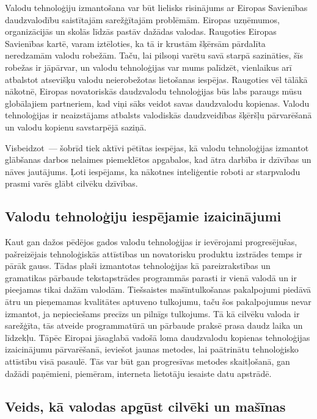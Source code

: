 \begin{multicols}{2}
Valodu tehnoloģiju izmantošana var būt lielisks risinājums ar Eiropas Savienības daudzvalodību saistītajām sarežģītajām problēmām.
Eiropas uzņēmumos, organizācijās un skolās līdzās pastāv dažādas valodas. 
Raugoties Eiropas Savienības kartē, varam iztēloties, ka tā ir krustām šķērsām pārdalīta neredzamām valodu robežām. 
Taču, lai pilsoņi varētu savā starpā sazināties, šīs robežas ir jāpārvar, un valodu tehnoloģijas var mums palīdzēt, vienlaikus arī atbalstot atsevišķu valodu neierobežotas lietošanas iespējas. 
Raugoties vēl tālākā nākotnē, Eiropas novatoriskās daudzvalodu tehnoloģijas būs labs paraugs mūsu globālajiem partneriem, kad viņi sāks veidot savas daudzvalodu kopienas. 
Valodu tehnoloģijas ir neaizstājams atbalsts valodiskās daudzveidības šķēršļu pārvarēšanā un valodu kopienu savstarpējā saziņā.

Visbeidzot~--- šobrīd tiek aktīvi pētītas iespējas, kā valodu tehnoloģijas izmantot glābšanas darbos nelaimes piemeklētos apgabalos, kad ātra darbība ir dzīvības un nāves jautājums. 
Ļoti iespējams, ka nākotnes inteliģentie roboti ar starpvalodu prasmi varēs glābt cilvēku dzīvības.

\subsection{Valodu tehnoloģiju iespējamie izaicinājumi}


Kaut gan dažos pēdējos gados valodu tehnoloģijas ir ievērojami progresējušas, pašreizējais tehnoloģiskās attīstības un novatorisku produktu izstrādes temps ir pārāk gauss. 
Tādas plaši izmantotas tehnoloģijas kā pareizrakstības un gramatikas pārbaude tekstapstrādes programmās parasti ir vienā valodā un ir pieejamas tikai dažām valodām.
Tiešsaistes mašīntulkošanas pakalpojumi piedāvā ātru un pieņemamas kvalitātes aptuveno tulkojumu, taču šos pakalpojumus nevar izmantot, ja nepieciešams precīzs un pilnīgs tulkojums. 
Tā kā cilvēku valoda ir sarežģīta, tās atveide programmatūrā un pārbaude praksē prasa daudz laika un līdzekļu. 
Tāpēc Eiropai jāsaglabā vadošā loma daudzvalodu kopienas tehnoloģijas izaicinājumu pārvarēšanā, ieviešot jaunas metodes, lai paātrinātu tehnoloģisko attīstību visā pasaulē. 
Tās var būt gan progresīvas metodes skaitļošanā, gan dažādi paņēmieni, piemēram, interneta lietotāju iesaiste datu apstrādē.
\subsection{Veids, kā valodas apgūst cilvēki un mašīnas}


\end{multicols}
